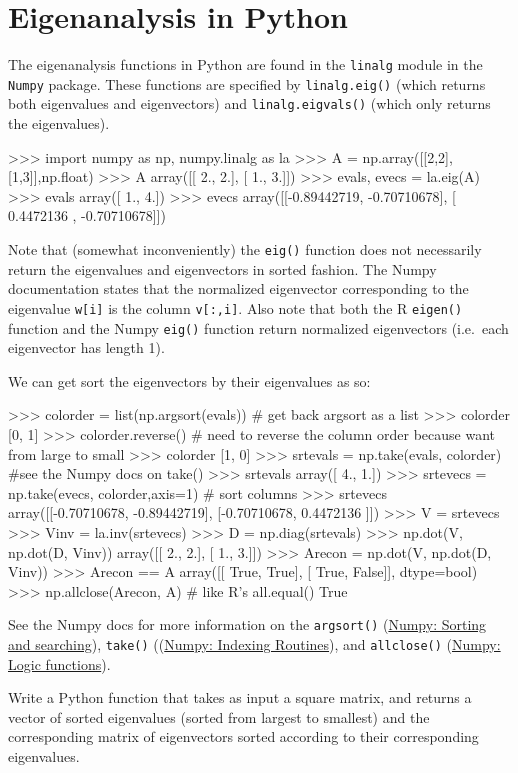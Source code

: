 
\section{Eigenanalysis in Python}

The eigenanalysis functions in Python are found in the
\lstinline!linalg! module in the \lstinline!Numpy! package. These
functions are specified by \lstinline!linalg.eig()! (which returns both
eigenvalues and eigenvectors) and \lstinline!linalg.eigvals()! (which
only returns the eigenvalues).

\begin{python}
>>> import numpy as np, numpy.linalg as la
>>> A = np.array([[2,2],[1,3]],np.float)
>>> A
array([[ 2.,  2.],
       [ 1.,  3.]])
>>> evals, evecs = la.eig(A)
>>> evals
array([ 1.,  4.])
>>> evecs
array([[-0.89442719, -0.70710678],
       [ 0.4472136 , -0.70710678]])
\end{python}
Note that (somewhat inconveniently) the \lstinline!eig()! function does
not necessarily return the eigenvalues and eigenvectors in sorted
fashion. The Numpy documentation states that the normalized eigenvector
corresponding to the eigenvalue \lstinline!w[i]! is the column
\lstinline!v[:,i]!. Also note that both the R \lstinline!eigen()!
function and the Numpy \lstinline!eig()! function return normalized
eigenvectors (i.e.~each eigenvector has length 1).

We can get sort the eigenvectors by their eigenvalues as so:

\begin{python}
>>> colorder = list(np.argsort(evals)) # get back argsort as a list
>>> colorder
[0, 1]
>>> colorder.reverse() # need to reverse the column order because want from large to small
>>> colorder
[1, 0]
>>> srtevals = np.take(evals, colorder) #see the Numpy docs on take()
>>> srtevals
array([ 4.,  1.])
>>> srtevecs = np.take(evecs, colorder,axis=1) # sort columns
>>> srtevecs
array([[-0.70710678, -0.89442719],
       [-0.70710678,  0.4472136 ]])
>>> V = srtevecs
>>> Vinv = la.inv(srtevecs)
>>> D = np.diag(srtevals)
>>> np.dot(V, np.dot(D, Vinv))
array([[ 2.,  2.],
       [ 1.,  3.]])
>>> Arecon = np.dot(V, np.dot(D, Vinv))
>>> Arecon == A
array([[ True,  True],
       [ True, False]], dtype=bool)
>>> np.allclose(Arecon, A)  # like R's all.equal()
True     
\end{python}
See the Numpy docs for more information on the \lstinline!argsort()!
(\href{http://docs.scipy.org/doc/numpy/reference/routines.sort.html}{Numpy:
Sorting and searching}), \lstinline!take()!
((\href{http://docs.scipy.org/doc/numpy/reference/routines.indexing.html}{Numpy:
Indexing Routines}), and \lstinline!allclose()!
(\href{http://docs.scipy.org/doc/numpy/reference/routines.logic.html}{Numpy:
Logic functions}).

\begin{assignment}
Write a Python function that takes as input a
square matrix, and returns a vector of sorted eigenvalues (sorted from
largest to smallest) and the corresponding matrix of eigenvectors sorted
according to their corresponding eigenvalues.
\end{assignment}